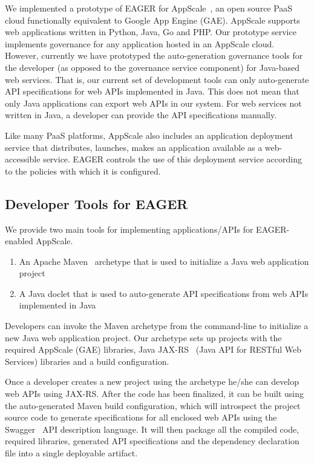 We implemented a prototype of EAGER for AppScale~\cite{appscale13}, 
an open source PaaS cloud
functionally equivalent to Google App Engine (GAE).  AppScale supports
web applications written in Python, Java, Go and PHP. Our prototype service
implements governance for any application hosted in an AppScale cloud. 
However,
currently we have prototyped the auto-generation governance tools for the
developer (as opposed to the
governance service component) for Java-based web services.
That is, our current set of development tools can only auto-generate API
specifications for web APIs implemented in Java. This does not mean that only
Java applications can export web APIs in our system. For web services not
written in Java, a developer can
provide the API specifications manually.

Like many PaaS platforms, AppScale also includes an application deployment
service that distributes, launches, makes an application available
as a web-accessible service.  EAGER controls the use of this deployment
service according
to the policies with which it is configured.

\subsection{Developer Tools for EAGER}
We provide two main tools for implementing applications/APIs for EAGER-enabled AppScale.
\begin{enumerate}
\item An Apache Maven~\cite{maven} archetype that is used to initialize a Java web application project
\item A Java doclet that is used to auto-generate API specifications from web APIs implemented in Java
\end{enumerate}

Developers can invoke the Maven archetype from the command-line to initialize
a new Java web application project. Our archetype sets up projects with the
required AppScale (GAE) libraries, Java JAX-RS~\cite{jaxrs} (Java API for RESTful Web
Services) libraries and a build configuration.

Once a developer creates a new project using the archetype he/she can develop
web APIs using JAX-RS. After the code has been finalized, it can be built
using the auto-generated Maven build configuration, which will introspect the
project source code to generate specifications for all enclosed web APIs using
the Swagger~\cite{swagger} API description language. 
It will then package all the compiled
code, required libraries, generated API specifications and the dependency
declaration file into a single deployable artifact.

